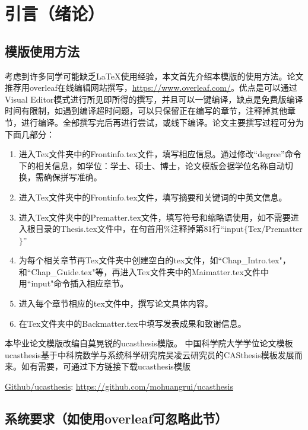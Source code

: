 \chapter{引言（绪论）}\label{chap:introduction}

\section{模版使用方法}

考虑到许多同学可能缺乏\LaTeX{}使用经验，本文首先介绍本模版的使用方法。论文推荐用overleaf在线编辑网站撰写，\url{https://www.overleaf.com/}。优点是可以通过Visual Editor模式进行所见即所得的撰写，并且可以一键编译，缺点是免费版编译时间有限制，如遇到编译超时问题，可以只保留正在编写的章节，注释掉其他章节，进行编译。全部撰写完后再进行尝试，或线下编译。论文主要撰写过程可分为下面几部分：
\begin{enumerate}
    \item 进入Tex文件夹中的Frontinfo.tex文件，填写相应信息。通过修改``degree”命令下的相关信息，如学位：学士、硕士、博士，论文模版会据学位名称自动切换，需确保拼写准确。
    \item 进入Tex文件夹中的Frontinfo.tex文件，填写摘要和关键词的中英文信息。
    \item 进入Tex文件夹中的Prematter.tex文件，填写符号和缩略语使用，如不需要进入根目录的Thesis.tex文件中，在句首用$\%$注释掉第81行“input$\{$Tex/Prematter$\}$”
    \item 为每个相关章节再Tex文件夹中创建空白的tex文件，如``Chap\_Intro.tex"，和``Chap\_Guide.tex"等，再进入Tex文件夹中的Maimatter.tex文件中用``input"命令插入相应章节。
    \item 进入每个章节相应的tex文件中，撰写论文具体内容。
    \item 在Tex文件夹中的Backmatter.tex中填写发表成果和致谢信息。
\end{enumerate}

本毕业论文模版改编自莫晃锐的ucasthesis模版。
中国科学院大学学位论文模板ucasthesis基于中科院数学与系统科学研究院吴凌云研究员的CASthesis模板发展而来。如有需要，可通过下方链接下载ucasthesis模版
\begin{center}
    \href{https://github.com/mohuangrui/ucasthesis}{Github/ucasthesis}: \url{https://github.com/mohuangrui/ucasthesis}
\end{center}

\section{系统要求（如使用overleaf可忽略此节）}\label{sec:system}

